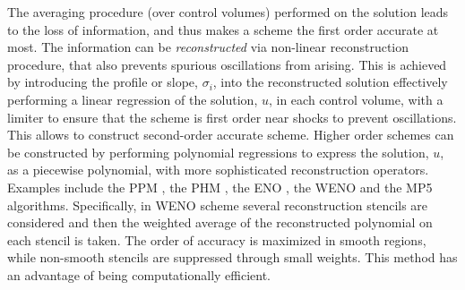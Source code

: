 The averaging procedure (over control volumes) performed on the solution leads to the loss of information,
and thus makes a scheme the first order accurate at most.
The information can be \textit{reconstructed} via non-linear reconstruction procedure,
that also prevents spurious oscillations from arising.
This is achieved by introducing the profile or slope, $\sigma_i$, into the reconstructed solution 
effectively performing a linear regression of the solution, $u$, 
in each control volume, with a limiter to ensure 
that the scheme is first order near shocks to prevent oscillations.
This allows to construct second-order accurate scheme. 
%
Higher order schemes can be constructed by performing 
polynomial regressions to express the solution, $u$, as a piecewise polynomial, with
more sophisticated reconstruction operators.
Examples include 
the \ac{PPM} \citep{Colella:1984,Colella:2008}, 
the \ac{PHM} \citep{Marquina:1994}, 
the \ac{ENO} \citep{Harten:1987,Shu:1988,Shu:1989}, 
the \ac{WENO} \citep{Liu:1994,Jiang:1996} and 
the \ac{MP5} \citep{Suresh:1997} 
algorithms.
Specifically, in \ac{WENO} scheme several reconstruction stencils are considered and 
then the weighted average of the reconstructed polynomial on each stencil is taken.
The order of accuracy is maximized in smooth regions, while non-smooth stencils are suppressed through small weights.
This method has an advantage of being computationally efficient.
